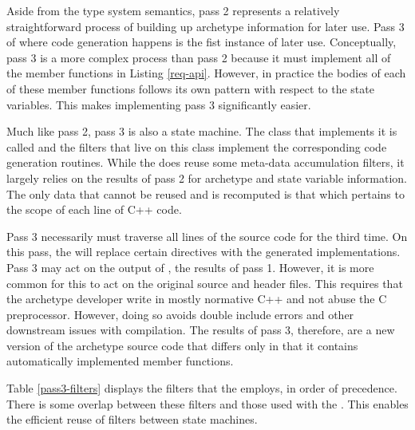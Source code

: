 Aside from the type system semantics, pass 2 represents a relatively straightforward
process of building up archetype information for later use. Pass 3 of \cycpp where 
code generation happens is the fist instance of later use.  Conceptually, 
pass 3 is a more complex process than pass 2 because it must implement 
all of the member functions in Listing \ref{req-api}. However, in practice the bodies 
of each of these member functions follows its own pattern with respect to the 
state variables. This makes implementing pass 3 significantly easier.

Much like pass 2, pass 3 is also a state machine. The class that implements it is 
called  and the filters that live on this class implement 
the corresponding code generation routines.  While the   does 
reuse some meta-data accumulation filters, it largely relies on the results of 
pass 2 for archetype and state variable information.  The only data that cannot be 
reused and is recomputed is that which pertains to the scope of each line of C++ code.

Pass 3 necessarily must traverse all lines of the source code for the third time.
On this pass, the  will replace certain 
directives with the generated implementations.  Pass 3 may act on the output of
, the results of pass 1.  However, it is more common for this 
to act on the original source and header files.  This requires that the 
archetype developer write in mostly normative C++ and not abuse the C preprocessor.
However, doing so avoids double include errors and other downstream issues with 
compilation. The results of pass 3, therefore, are a new version of the archetype
source code that differs only in that it contains automatically implemented 
member functions.

Table \ref{pass3-filters} displays the filters that the  
employs, in order of precedence.  There is some overlap between these filters
and those used with the . This enables the efficient reuse
of filters between state machines.

